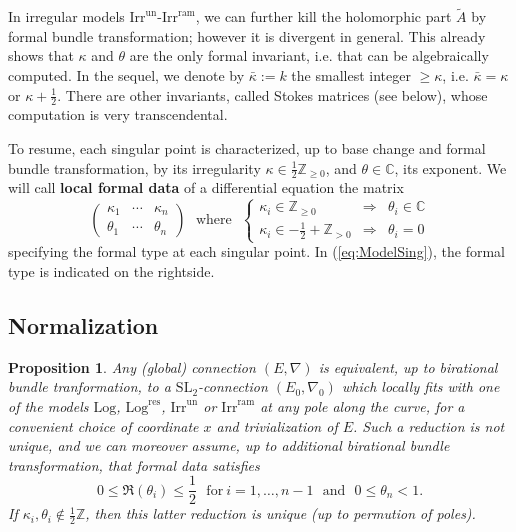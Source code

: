 \documentclass[12]{amsart}
\newtheorem{prop}[thm]{Proposition}
\newcommand{\SL}{\mathrm{SL}_2}
\newcommand{\Log}{\boldsymbol{\mathrm{Log}}}
\newcommand{\Logres}{\boldsymbol{\mathrm{Log}^{\mathrm{res}}}}
\newcommand{\Irrun}{\boldsymbol{\mathrm{Irr}^{\mathrm{un}}}}
\newcommand{\Irram}{\boldsymbol{\mathrm{Irr}^{\mathrm{ram}}}}
\begin{document}
In irregular models $\Irrun$-$\Irram$, we can further
kill the holomorphic part $\tilde A$ by formal bundle transformation; however it is divergent in general.
This already shows that $\kappa$ and $\theta$ are the only formal invariant, i.e. that can be 
algebraically computed. In the sequel, we denote by $\bar\kappa:=k$ the smallest integer $\ge\kappa$, i.e.  $\bar\kappa=\kappa$ or $\kappa+\frac{1}{2}$. There are other invariants, called Stokes matrices (see below), 
whose computation is very transcendental. 


To resume, each singular point is characterized, up to base change and formal bundle transformation, 
by its irregularity $\kappa\in\frac{1}{2}\mathbb Z_{\ge0}$, and $\theta\in\mathbb C$, its exponent. 
We will call {\bf local formal data} of a differential
equation the matrix 
\begin{equation}\label{eq:LocForData}
\begin{pmatrix}\kappa_1&\cdots&\kappa_n\\
\theta_1&\cdots&\theta_n\end{pmatrix}\ \ \ \text{where}\ \ \ 
\left\{\begin{matrix}
\kappa_i\in\mathbb Z_{\ge0}&\Rightarrow&\theta_i\in\mathbb C\\
\kappa_i\in-\frac{1}{2}+\mathbb Z_{>0}&\Rightarrow&\theta_i=0
\end{matrix}\right.
\end{equation}
specifying the formal type at each singular point. In (\ref{eq:ModelSing}), the formal type is indicated on the rightside.

\subsection{Normalization}

\begin{prop}\label{prop:normalizedequation}
Any (global) connection $(E,\nabla)$ is equivalent, up to birational bundle tranformation,
to a $\SL$-connection $(E_0,\nabla_0)$ which locally fits with one of the models 
$\Log$, $\Logres$, $\Irrun$ or $\Irram$
at any pole along the curve, for a convenient choice of coordinate $x$ and trivialization of $E$.
Such a reduction is not unique, and we can moreover assume, up to additional birational bundle transformation,
that formal data satisfies
$$0\le\Re(\theta_i)\le\frac{1}{2}\ \ \ \text{for}\ i=1,\ldots,n-1\ \ \ \text{and}\ \ \ 0\le\theta_n<1.$$
If $\kappa_i,\theta_i\not\in\frac{1}{2}\mathbb Z$, then this latter reduction is unique (up to permution of poles).
\end{prop}
\end{document}
